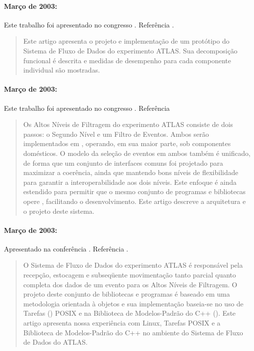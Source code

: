 \paragraph{Março de 2003: } Este trabalho foi apresentado no congresso . Referência \cite{aa:chep-2003-2}.

\begin{quotation}
Este artigo apresenta o projeto e implementação de um protótipo do Sistema de
Fluxo de Dados do experimento ATLAS. Sua decomposição funcional é descrita e
medidas de desempenho para cada componente individual são mostradas.
\end{quotation}

\paragraph{Março de 2003: } Este trabalho foi apresentado no congresso
. Referência
\cite{aa:chep-2003-3}

\begin{quotation}
Os Altos Níveis de Filtragem do experimento ATLAS consiste de dois passos: o
Segundo Nível e um Filtro de Eventos. Ambos serão implementados em
, operando, em sua maior parte, sob componentes domésticos. O
modelo da seleção de eventos em ambos também é unificado, de forma que um
conjunto de interfaces comuns foi projetado para maximizar a coerência, ainda
que mantendo bons níveis de flexibilidade para garantir a interoperabilidade
aos dois níveis. Este enfoque é ainda estendido para permitir que o mesmo
conjunto de programas e bibliotecas opere , facilitando o
desenvolvimento. Este artigo descreve a arquitetura e o projeto deste sistema.
\end{quotation}

\paragraph{Março de 2003: } Apresentado na conferência
. Referência \cite{aa:chep-2003}.

\begin{quotation}
O Sistema de Fluxo de Dados do experimento ATLAS é responsável pela recepção,
estocagem e subseqüente movimentação tanto parcial quanto completa dos dados
de um evento para os Altos Níveis de Filtragem. O projeto deste conjunto de
bibliotecas e programas é baseado em uma metodologia orientada à objetos e sua
implementação baseia-se no uso de Tarefas () POSIX e na
Biblioteca de Modelos-Padrão do C++ (). Este
artigo apresenta nossa experiência com Linux, Tarefas POSIX e a Biblioteca de
Modelos-Padrão do C++ no ambiente  do Sistema de Fluxo de Dados do
ATLAS.
\end{quotation}

